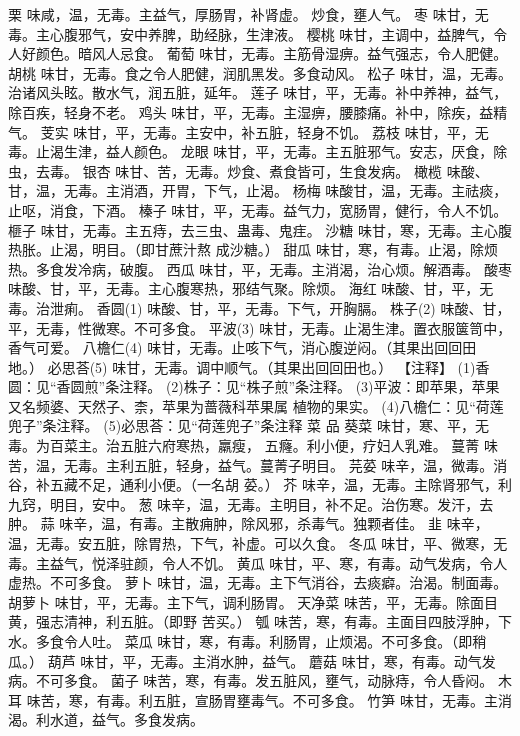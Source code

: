 \documentclass[12pt,UTF8]{ctexbook}
\begin{document}
栗 味咸，温，无毒。主益气，厚肠胃，补肾虚。
炒食，壅人气。
枣 味甘，无毒。主心腹邪气，安中养脾，助经脉，生津液。
樱桃 味甘，主调中，益脾气，令人好颜色。暗风人忌食。
葡萄 味甘，无毒。主筋骨湿痹。益气强志，令人肥健。
胡桃 味甘，无毒。食之令人肥健，润肌黑发。多食动风。
松子 味甘，温，无毒。治诸风头眩。散水气，润五脏，延年。
莲子 味甘，平，无毒。补中养神，益气，除百疾，轻身不老。
鸡头 味甘，平，无毒。主湿痹，腰膝痛。补中，除疾，益精气。
芰实 味甘，平，无毒。主安中，补五脏，轻身不饥。
荔枝 味甘，平，无毒。止渴生津，益人颜色。
龙眼 味甘，平，无毒。主五脏邪气。安志，厌食，除虫，去毒。
银杏 味甘、苦，无毒。炒食、煮食皆可，生食发病。
橄榄 味酸、甘，温，无毒。主消酒，开胃，下气，止渴。
杨梅 味酸甘，温，无毒。主祛痰，止呕，消食，下酒。
榛子 味甘，平，无毒。益气力，宽肠胃，健行，令人不饥。
榧子 味甘，无毒。主五痔，去三虫、蛊毒、鬼疰。
沙糖 味甘，寒，无毒。主心腹热胀。止渴，明目。（即甘蔗汁熬
成沙糖。）
甜瓜 味甘，寒，有毒。止渴，除烦热。多食发冷病，破腹。
西瓜 味甘，平，无毒。主消渴，治心烦。解酒毒。
酸枣 味酸、甘，平，无毒。主心腹寒热，邪结气聚。除烦。
海红 味酸、甘，平，无毒。治泄痢。
香圆(1) 味酸、甘，平，无毒。下气，开胸膈。
株子(2) 味酸、甘，平，无毒，性微寒。不可多食。
平波(3) 味甘，无毒。止渴生津。置衣服箧笥中，香气可爱。
八檐仁(4) 味甘，无毒。止咳下气，消心腹逆闷。（其果出回回田
地。）
必思荅(5) 味甘，无毒。调中顺气。（其果出回回田也。）
【注释】
(1)香圆：见“香圆煎”条注释。
(2)株子：见“株子煎”条注释。
(3)平波：即苹果，苹果又名频婆、天然子、柰，苹果为蔷薇科苹果属
植物的果实。
(4)八檐仁：见“荷莲兜子”条注释。
(5)必思荅：见“荷莲兜子”条注释
菜 品
葵菜 味甘，寒、平，无毒。为百菜主。治五脏六府寒热，羸瘦，
五癃。利小便，疗妇人乳难。
蔓菁 味苦，温，无毒。主利五脏，轻身，益气。蔓菁子明目。
芫荽 味辛，温，微毒。消谷，补五藏不足，通利小便。（一名胡
荽。）
芥 味辛，温，无毒。主除肾邪气，利九窍，明目，安中。
葱 味辛，温，无毒。主明目，补不足。治伤寒。发汗，去肿。
蒜 味辛，温，有毒。主散痈肿，除风邪，杀毒气。独颗者佳。
韭 味辛，温，无毒。安五脏，除胃热，下气，补虚。可以久食。
冬瓜 味甘，平、微寒，无毒。主益气，悦泽驻颜，令人不饥。
黄瓜 味甘，平、寒，有毒。动气发病，令人虚热。不可多食。
萝卜 味甘，温，无毒。主下气消谷，去痰癖。治渴。制面毒。
胡萝卜 味甘，平，无毒。主下气，调利肠胃。
天净菜 味苦，平，无毒。除面目黄，强志清神，利五脏。（即野
苦买。）
瓠 味苦，寒，有毒。主面目四肢浮肿，下水。多食令人吐。
菜瓜 味甘，寒，有毒。利肠胃，止烦渴。不可多食。（即稍
瓜。）
葫芦 味甘，平，无毒。主消水肿，益气。
蘑菇 味甘，寒，有毒。动气发病。不可多食。
菌子 味苦，寒，有毒。发五脏风，壅气，动脉痔，令人昏闷。
木耳 味苦，寒，有毒。利五脏，宣肠胃壅毒气。不可多食。
竹笋 味甘，无毒。主消渴。利水道，益气。多食发病。
\end{document}
